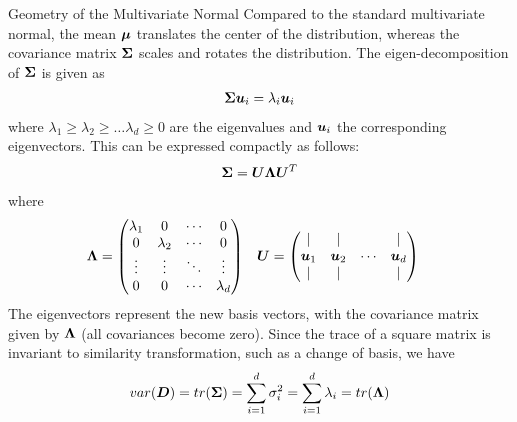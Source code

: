 \begin{frame}{Geometry of the Multivariate Normal}
  \small
  Compared to the standard multivariate normal,
  the mean ${\bm \mu}$ translates the center of the distribution, whereas
  the covariance matrix ${\bm \Sigma}$ scales and rotates the distribution.
The 
eigen-decomposition of ${\bm \Sigma}$ is given as
\begin{align*}
    {\bm \Sigma} {\boldsymbol u}_i = \lambda_i {\boldsymbol u}_i
\end{align*}
where $\lambda_1 \ge \lambda_2 \ge \dots \lambda_d \ge 0$ are the
eigenvalues and ${\boldsymbol u}_i$ the corresponding eigenvectors.
This can be expressed compactly
as follows:
\begin{align*}
    {\bm \Sigma} = {\boldsymbol U} {\bm \Lambda} {\boldsymbol U}^T
\end{align*}
where 
\begin{align*}
    {\bm \Lambda} & =
\begin{pmatrix} 
      \lambda_1 & 0 & \cdots & 0 \\
      0 & \lambda_2 & \cdots & 0\\
      \vdots & \vdots & \ddots & \vdots\\
      0 & 0 & \cdots & \lambda_d \\
   \end{pmatrix} &
{\boldsymbol U} & = \begin{pmatrix} 
    | & | &  & | \\
    {\boldsymbol u}_1 & {\boldsymbol u}_2 & \cdots & {\boldsymbol u}_d\\
    | & | &  & | \\
 \end{pmatrix}
\end{align*}
The eigenvectors represent the new basis vectors, with the covariance
matrix given by ${\bm \Lambda}$ (all covariances
become zero).
Since the trace of a square matrix is invariant to
similarity transformation, such as a change of basis, we have
\begin{align*}
  var({\boldsymbol D}) = tr({\bm \Sigma}) =
  \sum_{i=1}^d \sigma^2_i = \sum_{i=1}^d
  \lambda_i = tr({\bm \Lambda})
\end{align*}

\end{frame}


\def\mye{2.7183}
        \def\mypi{3.1416}
        \def\msigma#1{(sqrt(#1))}%
        \def\rho#1#2#3{((#3)/(\msigma{#1}*\msigma{#2}))}%
        \def\ccA#1#2#3{((1.0)/(2*\mypi*\msigma{#1}*\msigma{#2}*sqrt(1-\rho{#1}{#2
}{#3}^2)))} %
        \def\ccB#1#2#3{((-1.0)/(2*(1-(\rho{#1}{#2}{#3})^2)))}%
        \def\fA#1#2#3#4#5{(\ccA{#3}{#4}{#5})*\mye^(
        (\ccB{#3}{#4}{#5})*(((x-(#1))/(\msigma{#3}))^2 +
        ((y-(#2))/(\msigma{#4}))^2 -
        (2*(\rho{#3}{#4}{#5})*(x-(#1))*(y-(#2)))/(
        (\msigma{#3})*(\msigma{#4})) ))}%


